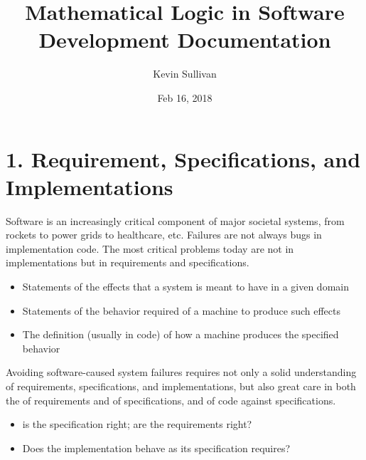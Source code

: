 \documentclass[letterpaper,10pt,english]{sphinxmanual}
\title{Mathematical Logic in Software Development Documentation}
\date{Feb 16, 2018}
\author{Kevin Sullivan}
\begin{document}
\maketitle
\sphinxtableofcontents
{}\label{\detokenize{index::doc}}



\chapter{1. Requirement, Specifications, and Implementations}
\label{\detokenize{01-reqs-specs-impls:requirement-specifications-and-implementations}}\label{\detokenize{01-reqs-specs-impls::doc}}\label{\detokenize{01-reqs-specs-impls:welcome-to-mathematical-logic-in-software-development}}
Software is an increasingly critical component of major societal
systems, from rockets to power grids to healthcare, etc. Failures are
not always bugs in implementation code. The most critical problems
today are not in implementations but in requirements and
specifications.
\begin{itemize}
\item {} 
 Statements of the effects that a system is meant to have in a given domain

\item {} 
 Statements of the behavior required of a machine to produce such effects

\item {} 
 The definition (usually in code) of how a machine produces the specified behavior

\end{itemize}

Avoiding software-caused system failures requires not only a solid
understanding of requirements, specifications, and implementations,
but also great care in both the  of requirements and of
specifications, and  of code against specifications.
\begin{itemize}
\item {} 
  is the specification right; are the requirements right?

\item {} 
  Does the implementation behave as its specification requires?

\end{itemize}
\end{document}
